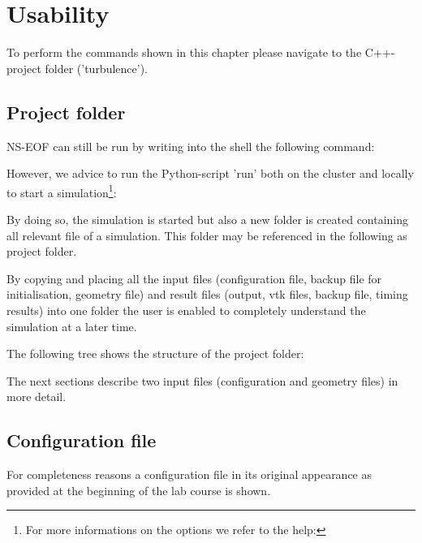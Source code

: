 
\chapter{Usability} %
\label{cha:usability}
To perform the commands shown in this chapter please navigate to the C++-project folder ('turbulence').


\section{Project folder} %
\label{sec:project_folder}

NS-EOF can still be run by writing into the shell the following command:


\noii However, we advice to run the Python-script 'run' both on the cluster and locally to start a simulation\footnote{For more informations on the options we refer to the help:
}:


\noii By doing so, the simulation is started but also a new folder is created containing all relevant file of a simulation. This folder may be referenced in the following as project folder.

\noii By copying and placing all the input files (configuration file, backup file for initialisation, geometry file) and result files (output, vtk files, backup file, timing results) into one folder the user is enabled to completely understand the simulation at a later time.

\noii The following tree shows the structure of the project folder:

\noii The next sections describe two input files (configuration and geometry files) in more detail.

\clearpage

\section{Configuration file} %
\label{sec:configuration_file}

For completeness reasons a configuration file in its original appearance as provided at the beginning of the lab course is shown. 

